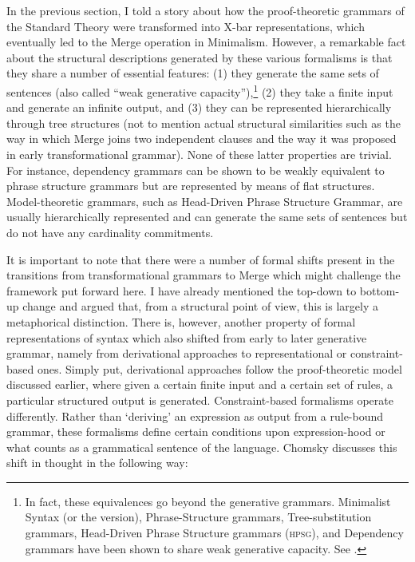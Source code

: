 \documentclass[output=paper]{langscibook}
\begin{document}
In the previous section, I told a story about how the proof-theoretic grammars of the Standard Theory were transformed into X-bar representations, which eventually led to the Merge operation in Minimalism. However, a remarkable fact about the structural descriptions generated by these various formalisms is that they share a number of essential features: (1) they generate the same sets of sentences (also called ``weak generative capacity''),\footnote{In fact, these equivalences go beyond the generative grammars.  Minimalist Syntax (or the \citealt{Stabler1997} version), Phrase-Structure grammars, Tree-substitution grammars, Head-Driven Phrase Structure grammars (\textsc{hpsg}), and Dependency grammars have been shown to share weak generative capacity. See \cite{Monnich2007}.} (2) they take a finite input and generate an infinite output, and (3) they can be represented hierarchically through tree structures (not to mention actual structural similarities such as the way in which Merge joins two independent clauses and the way it was proposed in early transformational grammar). None of these latter properties are trivial. For instance, dependency grammars can be shown to be weakly equivalent to phrase structure grammars but are represented by means of flat structures. Model-theoretic grammars, such as Head-Driven Phrase Structure Grammar, are usually hierarchically represented and can generate the same sets of sentences but do not have any cardinality commitments. 

It is important to note that there were a number of formal shifts present in the transitions from transformational grammars to Merge which might challenge the framework put forward here. I have already mentioned the top-down to bottom-up change and argued that, from a structural point of view, this is largely a metaphorical distinction. There is, however, another property of formal representations of syntax which also shifted from early to later generative grammar, namely from derivational approaches to representational or constraint-based ones. Simply put, derivational approaches follow the proof-theoretic model discussed earlier, where given a certain finite input and a certain set of rules, a particular structured output is generated. Constraint-based formalisms operate differently. Rather than \textquoteleft deriving' an expression as output from a rule-bound grammar, these formalisms define certain conditions upon expression-hood or what counts as a grammatical sentence of the language. Chomsky discusses this shift in thought in the following way:
\end{document}

